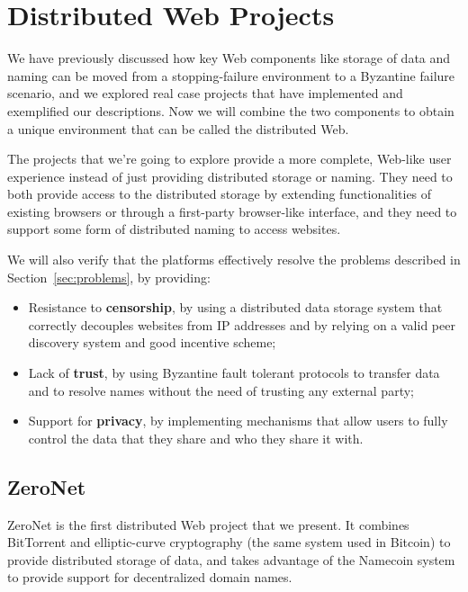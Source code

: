 \documentclass[mscthesis]{usiinfthesis}
\begin{document}
\chapter{Distributed Web Projects}\label{ch:projects}

We have previously discussed how key Web components like storage of data and naming can be moved from a stopping-failure environment to a Byzantine failure scenario, and we explored real case projects that have implemented and exemplified our descriptions. Now we will combine the two components to obtain a unique environment that can be called the distributed Web.


The projects that we're going to explore provide a more complete, Web-like user experience instead of just providing distributed storage or naming. They need to both provide access to the distributed storage by extending functionalities of existing browsers or through a first-party browser-like interface, and they need to support some form of distributed naming to access websites.

We will also verify that the platforms effectively resolve the problems described in Section~\ref{sec:problems}, by providing:
\begin{itemize}
	\item Resistance to \textbf{censorship}, by using a distributed data storage system that correctly decouples websites from IP addresses and by relying on a valid peer discovery system and good incentive scheme;
	\item Lack of \textbf{trust}, by using Byzantine fault tolerant protocols to transfer data and to resolve names without the need of trusting any external party;
	\item Support for \textbf{privacy}, by implementing mechanisms that allow users to fully control the data that they share and who they share it with.
\end{itemize}

\section{ZeroNet}\label{proj:zeronet}

ZeroNet is the first distributed Web project that we present. It combines BitTorrent and elliptic-curve cryptography (the same system used in Bitcoin) to provide distributed storage of data, and takes advantage of the Namecoin system to provide support for decentralized domain names.
\end{document}
